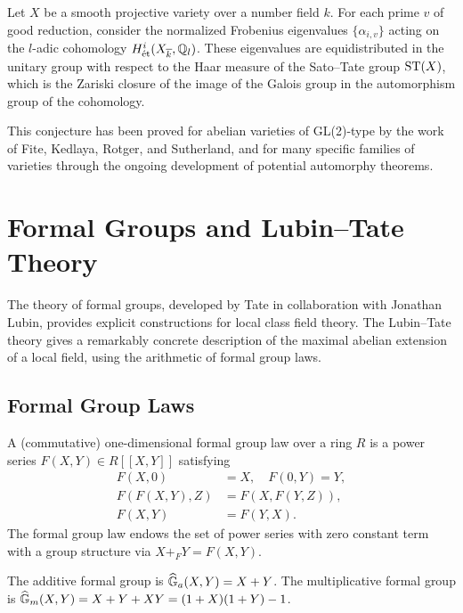 \begin{conjecture}
Let \(X\) be a smooth projective variety over a number field \(k\). For each prime \(v\) of good reduction, consider the normalized Frobenius eigenvalues \(\{\alpha_{i,v}\}\) acting on the \(l\)-adic cohomology \(H^i_{\text{\'et}}(X_{\overline{k}}, \mathbb{Q}_l)\). These eigenvalues are equidistributed in the unitary group with respect to the Haar measure of the Sato--Tate group \(\operatorname{ST}(X)\), which is the Zariski closure of the image of the Galois group in the automorphism group of the cohomology.
\end{conjecture}

This conjecture has been proved for abelian varieties of GL(2)-type by the work of Fite, Kedlaya, Rotger, and Sutherland, and for many specific families of varieties through the ongoing development of potential automorphy theorems.

\section{Formal Groups and Lubin--Tate Theory}

The theory of formal groups, developed by Tate in collaboration with Jonathan Lubin, provides explicit constructions for local class field theory. The Lubin--Tate theory gives a remarkably concrete description of the maximal abelian extension of a local field, using the arithmetic of formal group laws.

\subsection{Formal Group Laws}

A (commutative) one-dimensional formal group law over a ring \(R\) is a power series \(F(X,Y) \in R[[X,Y]]\) satisfying
\begin{align*}
F(X,0) &= X, \quad F(0,Y) = Y,\\
F(F(X,Y),Z) &= F(X,F(Y,Z)),\\
F(X,Y) &= F(Y,X).
\end{align*}
The formal group law endows the set of power series with zero constant term with a group structure via \(X +_F Y = F(X,Y)\).

\begin{example}
The additive formal group is \(\widehat{\mathbb{G}}_a(X,Y) = X + Y\). The multiplicative formal group is \(\widehat{\mathbb{G}}_m(X,Y) = X + Y + XY = (1+X)(1+Y) - 1\).
\end{example}

